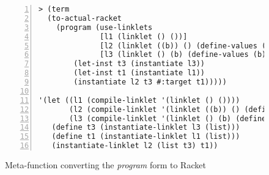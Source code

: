 \begin{figure}[!h]
\centering

\begin{minipage}{0.95\textwidth}
\begin{lstlisting}[language=racket,
                basicstyle=\ttfamily\footnotesize,
                numbers=left, xleftmargin=2em, numberstyle=\tiny]
> (term
  (to-actual-racket
    (program (use-linklets
              [l1 (linklet () ())]
              [l2 (linklet ((b)) () (define-values (a) 5) (+ a b))]
              [l3 (linklet () (b) (define-values (b) 3))]
        (let-inst t3 (instantiate l3))
        (let-inst t1 (instantiate l1))
        (instantiate l2 t3 #:target t1)))))

'(let ((l1 (compile-linklet '(linklet () ())))
       (l2 (compile-linklet '(linklet ((b)) () (define-values (a) 5) (+ a b))))
       (l3 (compile-linklet '(linklet () (b) (define-values (b) 3)))))
   (define t3 (instantiate-linklet l3 (list)))
   (define t1 (instantiate-linklet l1 (list)))
   (instantiate-linklet l2 (list t3) t1))
\end{lstlisting}
\caption{Meta-function converting the \emph{program} form to Racket}
\label{fig:convert-program-to-racket}
\end{minipage}
\end{figure}